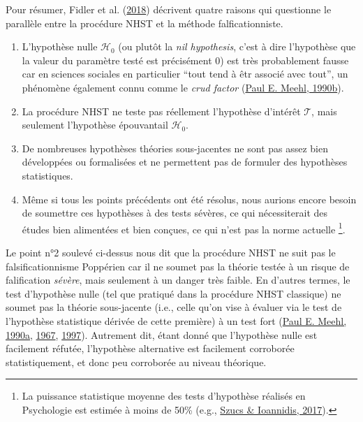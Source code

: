 \documentclass[
  a4paper,11pt,twoside,onecolumn,openright,final,oldfontcommands]{memoir}
\theoremstyle{definition}
\theoremstyle{definition}
\theoremstyle{definition}
\theoremstyle{definition}
\theoremstyle{remark}
\begin{document}
Pour résumer, Fidler et al. (\protect\hyperlink{ref-fidler_epistemic_2018}{2018}) décrivent quatre raisons qui questionne le parallèle entre la procédure NHST et la méthode falficationniste.

\begin{enumerate}
\def\labelenumi{\arabic{enumi}.}
\item
  L'hypothèse nulle \(\mathcal{H}_{0}\) (ou plutôt la \emph{nil hypothesis}, c'est à dire l'hypothèse que la valeur du paramètre testé est précisément \(0\)) est très probablement fausse car en sciences sociales en particulier ``tout tend à êtr associé avec tout'', un phénomène également connu comme le \emph{crud factor} (\protect\hyperlink{ref-meehl_why_1990}{Paul E. Meehl, 1990b}).
\item
  La procédure NHST ne teste pas réellement l'hypothèse d'intérêt \(\mathcal{T}\), mais seulement l'hypothèse épouvantail \(\mathcal{H}_{0}\).
\item
  De nombreuses hypothèses théories sous-jacentes ne sont pas assez bien développées ou formalisées et ne permettent pas de formuler des hypothèses statistiques.
\item
  Même si tous les points précédents ont été résolus, nous aurions encore besoin de soumettre ces hypothèses à des tests sévères, ce qui nécessiterait des études bien alimentées et bien conçues, ce qui n'est pas la norme actuelle \footnote{La puissance statistique moyenne des tests d'hypothèse réalisés en Psychologie est estimée à moins de 50\% (e.g., \protect\hyperlink{ref-szucs_empirical_2017-1}{Szucs \& Ioannidis, 2017}).}.
\end{enumerate}

Le point n°2 soulevé ci-dessus nous dit que la procédure NHST ne suit pas le falsificationnisme Poppérien car il ne soumet pas la théorie testée à un risque de falification \emph{sévère}, mais seulement à un danger très faible. En d'autres termes, le test d'hypothèse nulle (tel que pratiqué dans la procédure NHST classique) ne soumet pas la théorie sous-jacente (i.e., celle qu'on vise à évaluer via le test de l'hypothèse statistique dérivée de cette première) à un test fort (\protect\hyperlink{ref-meehl_appraising_1990}{Paul E. Meehl, 1990a}, \protect\hyperlink{ref-meehl_theory-testing_1967}{1967}, \protect\hyperlink{ref-harlow_problem_1997}{1997}). Autrement dit, étant donné que l'hypothèse nulle est facilement réfutée, l'hypothèse alternative est facilement corroborée statistiquement, et donc peu corroborée au niveau théorique.
\end{document}
